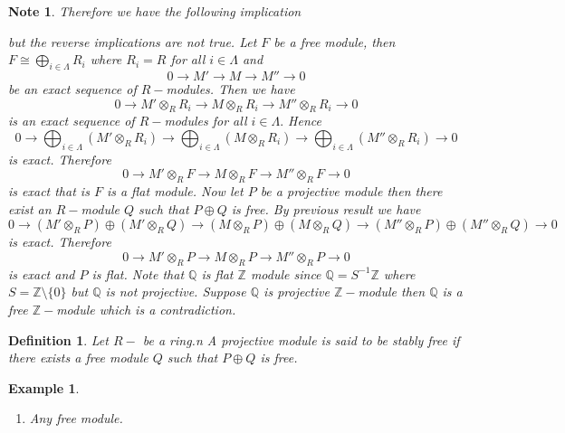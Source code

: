 \documentclass[11pt]{amsart}
\newtheorem{defn}[theorem]{Definition}
\newtheorem{eg}[theorem]{Example}
\newtheorem{note}[theorem]{Note}
\newcommand{\QQ}{\mathbb Q}
\newcommand{\ZZ}{\mathbb Z}
\begin{document}
\begin{note}
Therefore we have the following implication 
\begin{center}
\end{center}
but the reverse implications are not true. Let $F$ be a free module, then $F\cong \displaystyle\bigoplus_{i\in\Lambda} R_i$ where $R_i=R$ for all $i\in\Lambda$ and \begin{equation}
0\to M'\to M\to M''\to 0
\end{equation}
be an exact sequence of $R-$modules. Then we have $$0\to M'\otimes_R R_i\to M\otimes_R R_i\to M''\otimes_R R_i\to 0$$ is an exact sequence of $R-$modules for all $i\in\Lambda.$ Hence $$0\to \bigoplus_{i\in\Lambda} (M'\otimes_R R_i)\to \bigoplus_{i\in\Lambda} (M\otimes_R R_i)\to \bigoplus_{i\in\Lambda} (M''\otimes_R R_i)\to 0$$ is exact. Therefore $$0\to M'\otimes_R F\to M\otimes_R F\to M''\otimes_R F\to 0$$ is exact that is $F$ is a flat module. Now let $P$ be a projective module then there exist an $R-$module $Q$ such that $P\oplus Q$ is free. By previous result we have $$0\to (M'\otimes_R P)\oplus (M'\otimes_R Q)\to (M\otimes_R P)\oplus (M\otimes_R Q)\to (M''\otimes_R P)\oplus (M''\otimes_R Q)\to 0$$ is exact. Therefore $$0\to M'\otimes_R P\to M\otimes_R P\to M''\otimes_R P\to 0$$ is exact and $P$ is flat. Note that ${\QQ}$ is flat ${\ZZ}$ module since ${\QQ}=S^{-1}{\ZZ}$ where $S={\ZZ}\setminus\{0\}$ but ${\QQ}$ is not projective. Suppose ${\QQ}$ is projective ${\ZZ}-$module then ${\QQ}$ is a free ${\ZZ}-$module which is a contradiction.

\end{note}

\begin{defn}

Let $R-$ be a ring.n A projective module is said to be stably free if there exists a free module $Q$ such that $P\oplus Q$ is free.

\end{defn}

\begin{eg}

\begin{enumerate}

\item Any free module.

\end{enumerate}

\end{eg}
\end{document}
